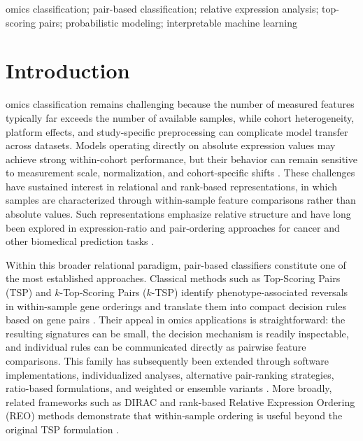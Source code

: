 \documentclass[journal]{IEEEtran}
\begin{document}
\begin{IEEEkeywords}
omics classification; pair-based classification; relative expression analysis; top-scoring pairs; probabilistic modeling; interpretable machine learning
\end{IEEEkeywords}

\IEEEpeerreviewmaketitle

\section{Introduction}

 omics classification remains challenging because the number of measured features typically far exceeds the number of available samples, while cohort heterogeneity, platform effects, and study-specific preprocessing can complicate model transfer across datasets. Models operating directly on absolute expression values may achieve strong within-cohort performance, but their behavior can remain sensitive to measurement scale, normalization, and cohort-specific shifts \cite{Aitchison1986,Zheng2025}. These challenges have sustained interest in relational and rank-based representations, in which samples are characterized through within-sample feature comparisons rather than absolute values. Such representations emphasize relative structure and have long been explored in expression-ratio and pair-ordering approaches for cancer and other biomedical prediction tasks \cite{Gordon2002,Bo2002,Geman2004,Wu2025}.

Within this broader relational paradigm, pair-based classifiers constitute one of the most established approaches. Classical methods such as Top-Scoring Pairs (TSP) and $k$-Top-Scoring Pairs ($k$-TSP) identify phenotype-associated reversals in within-sample gene orderings and translate them into compact decision rules based on gene pairs \cite{Geman2004,Tan2005}. Their appeal in omics applications is straightforward: the resulting signatures can be small, the decision mechanism is readily inspectable, and individual rules can be communicated directly as pairwise feature comparisons. This family has subsequently been extended through software implementations, individualized analyses, alternative pair-ranking strategies, ratio-based formulations, and weighted or ensemble variants \cite{Lin2009,Magis2012,Marchionni2013,Afsari2015,Wang2015,Huang2022}. More broadly, related frameworks such as DIRAC and rank-based Relative Expression Ordering (REO) methods demonstrate that within-sample ordering is useful beyond the original TSP formulation \cite{Eddy2010,Chen2023,Yan2024,Jin2025,Czajkowski2025}.
\end{document}
